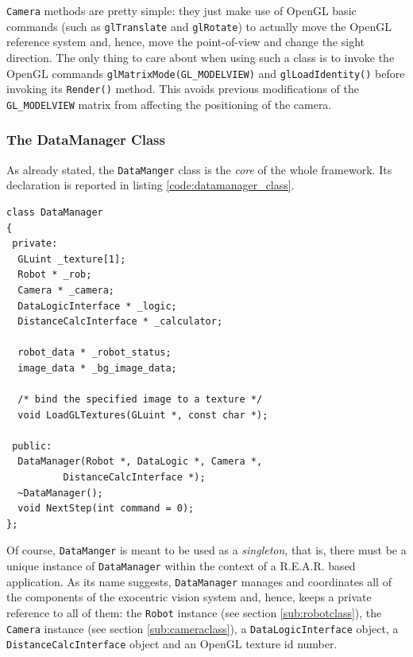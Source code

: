 %
\texttt{Camera} methods are pretty simple: they just make 
use of OpenGL basic commands (such as \texttt{glTranslate} 
and \texttt{glRotate}) to actually move the OpenGL reference 
system and, hence, move the point-of-view and change the sight 
direction.
%
The only thing to care about when using such a class is 
to invoke the OpenGL commands \texttt{glMatrixMode(GL\_MODELVIEW)} 
and \texttt{glLoadIdentity()} before invoking its 
\texttt{Render()} method. This avoids previous modifications 
of the \texttt{GL\_MODELVIEW} matrix from affecting the 
positioning of the camera.
%

%
\subsubsection{The DataManager Class}
\label{sub:datamanager}
As already stated, the \texttt{DataManger} class is the \textit{core}
of the whole framework. Its declaration is reported in 
listing \ref{code:datamanager_class}.
%
\begin{lstlisting}[caption={\texttt{DataManager} class declaration}, label={code:datamanager_class}, frame=trBL]
class DataManager
{
 private:
  GLuint _texture[1];
  Robot * _rob;
  Camera * _camera;
  DataLogicInterface * _logic;
  DistanceCalcInterface * _calculator;

  robot_data * _robot_status;
  image_data * _bg_image_data;

  /* bind the specified image to a texture */
  void LoadGLTextures(GLuint *, const char *);

 public:
  DataManager(Robot *, DataLogic *, Camera *, 
	      DistanceCalcInterface *); 
  ~DataManager();
  void NextStep(int command = 0);
};
\end{lstlisting}
%
Of course, \texttt{DataManger} is meant to be used as a \textit{singleton}, 
that is, there must be a unique instance of \texttt{DataManager} 
within the context of a \textsf{R.E.A.R.} based application.
%
As its name suggests, \texttt{DataManager} manages and coordinates 
all of the components of the exocentric vision system and, hence, 
keeps a private reference to all of them: 
the \texttt{Robot} instance (see section \ref{sub:robotclass}), the 
\texttt{Camera} instance (see section \ref{sub:cameraclass}),
a \texttt{DataLogicInterface} object, a \texttt{DistanceCalcInterface} 
object and an OpenGL texture id number.
%

